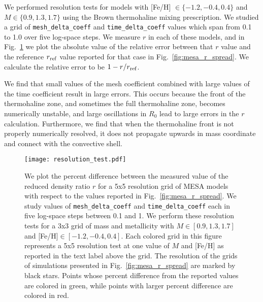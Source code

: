 We performed resolution tests for models with [Fe/H] $\in \{-1.2, -0.4, 0.4\}$ and $M \in \{0.9, 1.3, 1.7\}$ using the Brown thermohaline mixing prescription.
We studied a grid of \texttt{mesh\_delta\_coeff} and \texttt{time\_delta\_coeff} values which span from 0.1 to 1.0 over five log-space steps.
We measure $r$ in each of these models, and in Fig.~\ref{Fig:resolution_test} we plot the absolute value of the relative error between that $r$ value and the reference $r_{\rm ref}$ value reported for that case in Fig.~\ref{fig:mesa_r_spread}.
We calculate the relative error to be $1 - r/r_{\rm{ref}}$.

We find that small values of the mesh coefficient combined with large values of the time coefficient result in large errors.
This occurs because the front of the thermohaline zone, and sometimes the full thermohaline zone, becomes numerically unstable, and large oscillations in $R_0$ lead to large errors in the $r$ calculation.
Furthermore, we find that when the thermohaline front is not properly numerically resolved, it does not propagate upwards in mass coordinate and connect with the convective shell.


\begin{figure*}[!tb]
\begin{center}
\texttt{[image: resolution\_test.pdf]}
\caption{
    We plot the percent difference between the measured value of the reduced density ratio $r$ for a 5x5 resolution grid of MESA models with respect to the values reported in Fig.~\ref{fig:mesa_r_spread}.
    We study values of \texttt{mesh\_delta\_coeff} and \texttt{time\_delta\_coeff} each in five log-space steps between 0.1 and 1.
    We perform these resolution tests for a 3x3 grid of mass and metallicity with $M \in [0.9, 1.3, 1.7]$ and [Fe/H]$ \in [-1.2, -0.4, 0.4]$.
    Each colored grid in this figure represents a 5x5 resolution test at one value of $M$ and [Fe/H] as reported in the text label above the grid.
    The resolution of the grids of simulations presented in Fig.~\ref{fig:mesa_r_spread} are marked by black stars.
    Points whose percent difference from the reported values are colored in green, while points with larger percent difference are colored in red.
    }
\label{Fig:resolution_test}
\end{center}
\end{figure*}